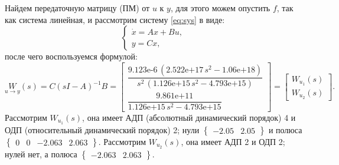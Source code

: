 Найдем передаточную матрицу (ПМ) от $u$ к $y$, для этого можем опустить $f$, так как система линейная,
и рассмотрим систему \eqref{eq:sys} в виде:
\begin{equation*}
    \begin{cases}
        \dot x=Ax+Bu,\\
        y=Cx,
    \end{cases}
\end{equation*}
после чего воспользуемся формулой:
\begin{equation*}
    \underset{u\rightarrow y}{W}(s)=C(sI-A)^{-1}B=
    \begin{bmatrix}
        \dfrac{\text{9.123e-6}\,{\left(\text{2.522e+17}\,s^2 -\text{1.06e+18}\right)}}{s^2 \,{\left(\text{1.126e+15}\,s^2 -\text{4.793e+15}\right)}}\\[2ex]
        \dfrac{\text{9.861e+11}}{\text{1.126e+15}\,s^2 -\text{4.793e+15}}
    \end{bmatrix}=
    \begin{bmatrix}
        W_{u_1}(s)\\W_{u_2}(s)
    \end{bmatrix}.
\end{equation*}
Рассмотрим $W_{u_1}(s)$, она имеет АДП (абсолютный динамический порядок) 4 и ОДП (относительный динамический порядок) 2;
нули $\left\{\begin{array}{cc}
-2.05&
2.05
\end{array}\right\}$ и полюса $\left\{\begin{array}{cccc}
0&
0&
-2.063&
2.063
\end{array}\right\}.$
Рассмотрим $W_{u_2}(s)$, она имеет АДП 2 и ОДП 2;
нулей нет, а полюса $\left\{\begin{array}{cc}
-2.063&
2.063
\end{array}\right\}.$

